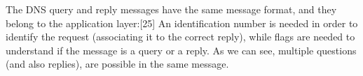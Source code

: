 \noindent The DNS query and reply messages have the same message format, and they belong to the application layer:[25]
An identification number is needed in order to identify the request (associating it to the correct reply), while flags are needed to understand if the message is a query or a reply. As we can see, multiple questions (and also replies), are possible in the same message.

